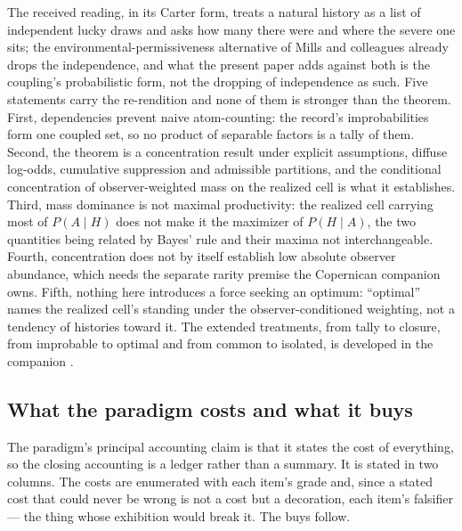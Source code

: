 \documentclass[11pt]{article}
\theoremstyle{definition}
\begin{document}
The received reading, in its Carter form, treats a natural history as a list of independent lucky draws and asks how many there were and where the severe one sits; the environmental-permissiveness alternative of Mills and colleagues \cite{mills2025hardsteps} already drops the independence, and what the present paper adds against both is the coupling's probabilistic form, not the dropping of independence as such. Five statements carry the re-rendition and none of them is stronger than the theorem. First, dependencies prevent naive atom-counting: the record's improbabilities form one coupled set, so no product of separable factors is a tally of them. Second, the theorem is a concentration result under explicit assumptions, diffuse log-odds, cumulative suppression and admissible partitions, and the conditional concentration of observer-weighted mass on the realized cell is what it establishes. Third, mass dominance is not maximal productivity: the realized cell carrying most of $P(A \mid H)$ does not make it the maximizer of $P(H \mid A)$, the two quantities being related by Bayes' rule and their maxima not interchangeable. Fourth, concentration does not by itself establish low absolute observer abundance, which needs the separate rarity premise the Copernican companion owns. Fifth, nothing here introduces a force seeking an optimum: ``optimal'' names the realized cell's standing under the observer-conditioned weighting, not a tendency of histories toward it. The extended treatments, from tally to closure, from improbable to optimal and from common to isolated, is developed in the companion \cite{Nexus}.

\subsection{What the paradigm costs and what it buys}
\label{sec:rerendition-ledger}
The paradigm's principal accounting claim is that it states the cost of everything, so the closing accounting is a ledger rather than a summary. It is stated in two columns. The costs are enumerated with each item's grade and, since a stated cost that could never be wrong is not a cost but a decoration, each item's falsifier --- the thing whose exhibition would break it. The buys follow.
\end{document}
